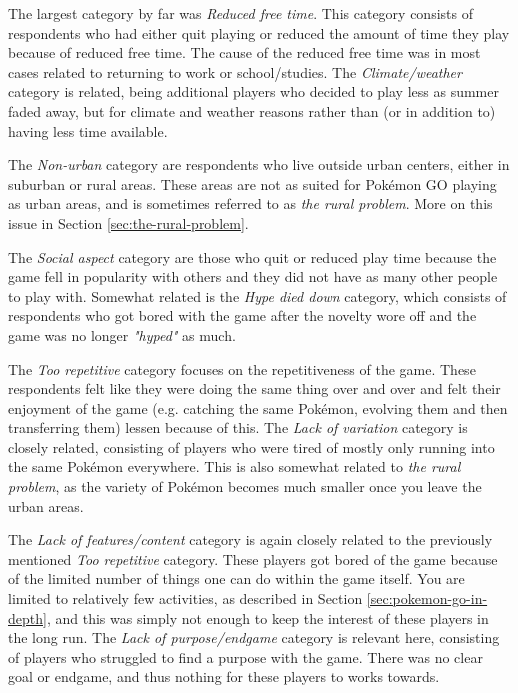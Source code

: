 The largest category by far was \emph{Reduced free time}. This category consists of respondents who had either quit playing or reduced the amount of time they play because of reduced free time. The cause of the reduced free time was in most cases related to returning to work or school/studies. The \emph{Climate/weather} category is related, being additional players who decided to play less as summer faded away, but for climate and weather reasons rather than (or in addition to) having less time available.

The \emph{Non-urban} category are respondents who live outside urban centers, either in suburban or rural areas. These areas are not as suited for Pokémon GO playing as urban areas, and is sometimes referred to as \emph{the rural problem}. More on this issue in Section \ref{sec:the-rural-problem}.

The \emph{Social aspect} category are those who quit or reduced play time because the game fell in popularity with others and they did not have as many other people to play with. Somewhat related is the \emph{Hype died down} category, which consists of respondents who got bored with the game after the novelty wore off and the game was no longer \emph{"hyped"} as much.

The \emph{Too repetitive} category focuses on the repetitiveness of the game. These respondents felt like they were doing the same thing over and over and felt their enjoyment of the game (e.g. catching the same Pokémon, evolving them and then transferring them) lessen because of this. The \emph{Lack of variation} category is closely related, consisting of players who were tired of mostly only running into the same Pokémon everywhere. This is also somewhat related to \emph{the rural problem}, as the variety of Pokémon becomes much smaller once you leave the urban areas.

The \emph{Lack of features/content} category is again closely related to the previously mentioned \emph{Too repetitive} category. These players got bored of the game because of the limited number of things one can do within the game itself. You are limited to relatively few activities, as described in Section \ref{sec:pokemon-go-in-depth}, and this was simply not enough to keep the interest of these players in the long run. The \emph{Lack of purpose/endgame} category is relevant here, consisting of players who struggled to find a purpose with the game. There was no clear goal or endgame, and thus nothing for these players to works towards.

